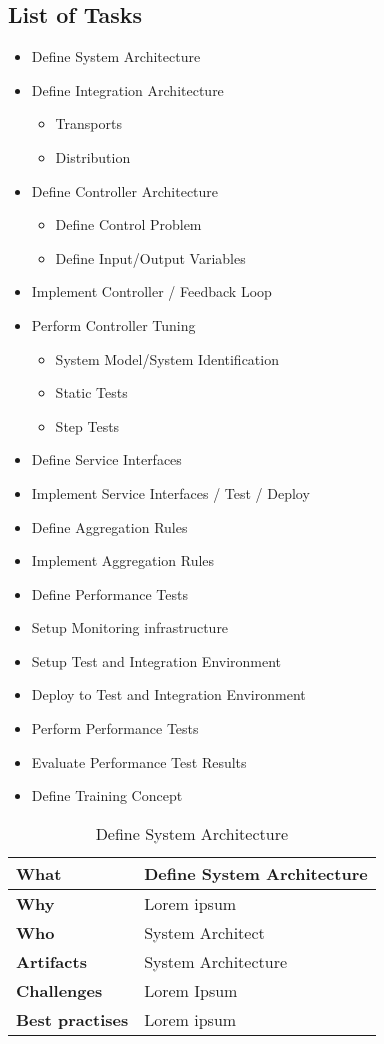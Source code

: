 \subsection{List of Tasks}
\begin{itemize}
	\item Define System Architecture 
	\item Define Integration Architecture
	\begin{itemize}
		\item Transports
		\item Distribution
	\end{itemize}
	\item Define Controller Architecture 
	\begin{itemize}
		\item Define Control Problem 
		\item Define Input/Output Variables 
	\end{itemize}
	\item Implement Controller / Feedback Loop
	\item Perform Controller Tuning 
	\begin{itemize}
		\item System Model/System Identification 
		\item Static Tests
		\item Step Tests
	\end{itemize}
	\item Define Service Interfaces
	\item Implement Service Interfaces / Test / Deploy
	\item Define Aggregation Rules
	\item Implement Aggregation Rules 
	\item Define Performance Tests 
	\item Setup Monitoring infrastructure
	\item Setup Test and Integration Environment
	\item Deploy to Test and Integration Environment
	\item Perform Performance Tests
	\item Evaluate Performance Test Results
	\item Define Training Concept
\end{itemize}
\begin{table}
	[!ht] \caption{Define System Architecture} \label{table:ch6_Task_Define_System_Architect} \centering 
	\begin{tabular}
		{|m{3cm}|m{10cm}|} \hline \bfseries What & Define System Architecture\\
		\hline \bfseries Why & Lorem ipsum\\
		\hline \bfseries Who & System Architect\\
		\hline \bfseries Artifacts & System Architecture\\
		\hline \bfseries Challenges & Lorem Ipsum\\
		\hline \bfseries Best practises & Lorem ipsum\\
		\hline 
	\end{tabular}
\end{table}

